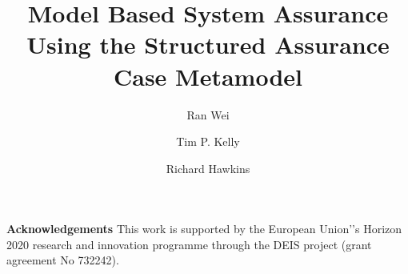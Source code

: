 \documentclass[runningheads,a4paper]{llncs}
\begin{document}
 
 
\title{\textbf{Model Based System Assurance Using the Structured Assurance Case Metamodel}}
\author{Ran Wei \and Tim P. Kelly \and Richard Hawkins}
\maketitle

















\noindent\textbf{Acknowledgements}
This work is supported by the European Union'’s Horizon 2020 research and innovation programme through the DEIS project (grant agreement No 732242). 

 
  
\end{document}
